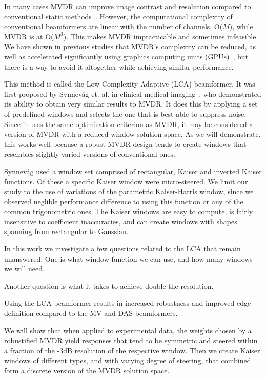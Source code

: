 \documentclass[10pt,journal,draftclsnofoot,onecolumn]{IEEEtran}
\newcommand\1{\vec 1}
\begin{document}
In many cases MVDR can improve image contrast and resolution compared to conventional static methods~\cite{Blomberg2013,Blomberg2012a,Dursun2009,Lo2004}. However, the computational complexity of conventional beamformers are linear with the number of channels, O($M$), while MVDR is at O($M^3$). This makes MVDR impracticable and sometimes infeasible. We have shown in previous studies that MVDR's complexity can be reduced, as well as accelerated significantly using graphics computing units (GPUs)~\cite{Buskenes2014,Asen2013}, but there is a way to avoid it altogether while achieving similar performance.

This method is called the Low Complexity Adaptive (LCA) beamformer. It was first proposed by Synnev\aa{}g et. al. in clinical medical imaging~\cite{Synnevag2008}, who demonstrated its ability to obtain very similar results to MVDR. It does this by applying a set of predefined windows and selects the one that is best able to suppress noise. Since it uses the same optimisation criterion as MVDR, it may be considered a version of MVDR with a reduced window solution space. As we will demonstrate, this works well because a robust MVDR design tends to create windows that resembles slightly varied versions of conventional ones. 

Synnev\aa{}g used a window set comprised of rectangular, Kaiser and inverted Kaiser functions. Of these a specific Kaiser window were micro-steered. We limit our study to the use of variations of the parametric Kaiser-Harris window, since we observed neglible performance difference to using this function or any of the common trigonometric ones. The Kaiser windows are easy to compute, is fairly insensitive to coefficient inaccuracies, and can create windows with shapes spanning from rectangular to Gaussian.


In this work we investigate a few questions related to the LCA that remain unanswered. One is what window function we can use, and how many windows we will need. 

Another question is what it takes to achieve double the resolution.


Using the LCA beamformer results in increased robustness and improved edge definition compared to the MV and DAS beamformers.


We will show that when applied to experimental data, the weights chosen by a robustified MVDR yield responses that tend to be symmetric and steered within a fraction of the -3dB resolution of the respective window. Then we create Kaiser windows of different types, and with varying degree of steering, that combined form a discrete version of the MVDR solution space. 
\end{document}
